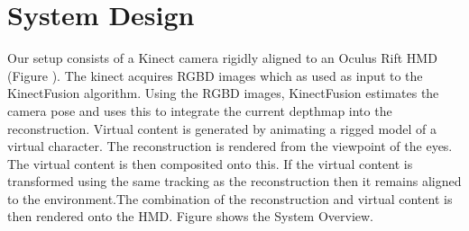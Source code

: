\section{System Design}
Our setup consists of a Kinect camera rigidly aligned to an Oculus Rift HMD (Figure   ). The kinect acquires RGBD images which as used as input to the KinectFusion algorithm. Using the RGBD images, KinectFusion estimates the camera pose and uses this to integrate the current depthmap into the reconstruction. Virtual content is generated by animating a rigged model of a virtual character. The reconstruction is rendered from the viewpoint of the eyes. The virtual content is then composited onto this. If the virtual content is transformed using the same tracking as the reconstruction then it remains aligned to the environment.The combination of the reconstruction and virtual content is then rendered onto the HMD. Figure  shows the System Overview. 











